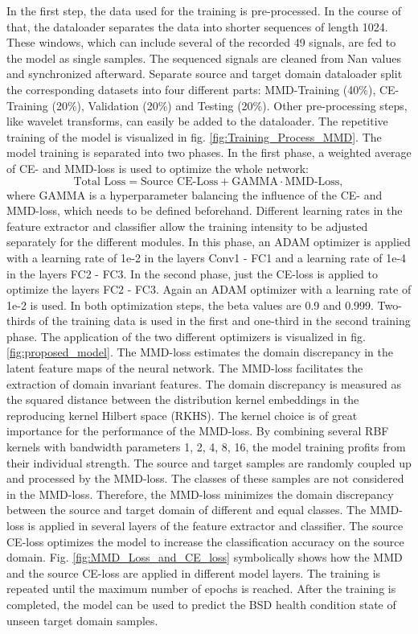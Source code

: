 In the first step, the data used for the training is pre-processed. In the course of that, the dataloader separates the data into shorter sequences of length 1024. These windows, which can include several of the recorded 49 signals, are fed to the model as single samples. The sequenced signals are cleaned from Nan values and synchronized afterward. Separate source and target domain dataloader split the corresponding datasets into four different parts: MMD-Training (40\%), CE-Training (20\%), Validation (20\%) and Testing (20\%). Other pre-processing steps, like wavelet transforms, can easily be added to the dataloader. The repetitive training of the model is visualized in fig. \ref{fig:Training_Process_MMD}. The model training is separated into two phases. In the first phase, a weighted average of CE- and MMD-loss is used to optimize the whole network: 
\begin{equation}
    \mbox{Total Loss} = \mbox{Source CE-Loss} + \mbox{GAMMA} \cdot \mbox{MMD-Loss}, 
\end{equation}
where GAMMA is a hyperparameter balancing the influence of the CE- and MMD-loss, which needs to be defined beforehand. Different learning rates in the feature extractor and classifier allow the training intensity to be adjusted separately for the different modules. In this phase, an ADAM optimizer is applied with a learning rate of 1e-2 in the layers Conv1 - FC1 and a learning rate of 1e-4 in the layers FC2 - FC3. In the second phase, just the CE-loss is applied to optimize the layers FC2 - FC3. Again an ADAM optimizer with a learning rate of 1e-2 is used. In both optimization steps, the beta values are 0.9 and 0.999. Two-thirds of the training data is used in the first and one-third in the second training phase. The application of the two different optimizers is visualized in fig. \ref{fig:proposed_model}. The MMD-loss estimates the domain discrepancy in the latent feature maps of the neural network. The MMD-loss facilitates the extraction of domain invariant features. The domain discrepancy is measured as the squared distance between the distribution kernel embeddings in the reproducing kernel Hilbert space (RKHS). The kernel choice is of great importance for the performance of the MMD-loss. By combining several RBF kernels with bandwidth parameters 1, 2, 4, 8, 16, the model training profits from their individual strength. The source and target samples are randomly coupled up and processed by the MMD-loss. The classes of these samples are not considered in the MMD-loss. Therefore, the MMD-loss minimizes the domain discrepancy between the source and target domain of different and equal classes. The MMD-loss is applied in several layers of the feature extractor and classifier. The source CE-loss optimizes the model to increase the classification accuracy on the source domain. Fig. \ref{fig:MMD_Loss_and_CE_loss} symbolically shows how the MMD and the source CE-loss are applied in different model layers. The training is repeated until the maximum number of epochs is reached. After the training is completed, the model can be used to predict the BSD health condition state of unseen target domain samples. 



